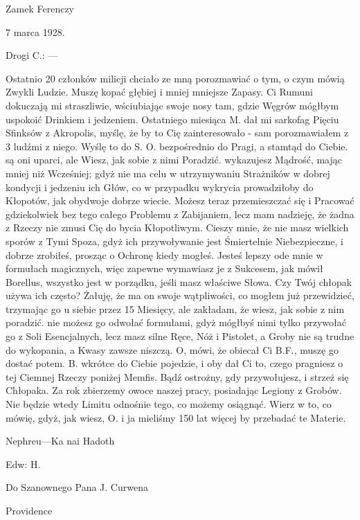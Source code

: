 \begin{displayquote}

\begin{flushright}
Zamek Ferenczy

7 marca 1928.
\end{flushright}

Drogi C.: —

Ostatnio 20 członków milicji chciało ze mną porozmawiać o tym, o czym mówią Zwykli Ludzie. Muszę kopać głębiej i mniej mniejsze Zapasy. Ci Rumuni dokuczają mi straszliwie, wściubiając swoje nosy tam, gdzie Węgrów mógłbym uspokoić Drinkiem i jedzeniem. Ostatniego miesiąca M. dał mi sarkofag Pięciu Sfinksów z Akropolis, myślę, że by to Cię zainteresowało - sam porozmawiałem z 3 ludźmi z niego. Wyślę to do S. O. bezpośrednio do Pragi, a stamtąd do Ciebie. są oni uparci, ale Wiesz, jak sobie z nimi Poradzić. wykazujesz Mądrość, mając mniej niż Wcześniej; gdyż nie ma celu w utrzymywaniu Strażników w dobrej kondycji i jedzeniu ich Głów, co w przypadku wykrycia prowadziłoby do Kłopotów, jak obydwoje dobrze wiecie. Możesz teraz przemieszczać się i Pracować gdziekolwiek bez tego całego Problemu z Zabijaniem, lecz mam nadzieję, że żadna z Rzeczy nie zmusi Cię do bycia Kłopotliwym. Cieszy mnie, że nie masz wielkich sporów z Tymi Spoza, gdyż ich przywoływanie jest Śmiertelnie Niebezpieczne, i dobrze zrobiłeś, prosząc o Ochronę kiedy mogłeś. Jesteś lepszy ode mnie w formułach magicznych, więc zapewne wymawiasz je z Sukcesem, jak mówił Borellus, wszystko jest w porządku, jeśli masz właściwe Słowa. Czy Twój chłopak używa ich często? Żałuję, że ma on swoje wątpliwości, co mogłem już przewidzieć, trzymając go u siebie przez 15 Miesięcy, ale zakładam, że wiesz, jak sobie z nim poradzić. nie możesz go odwołać formułami, gdyż mógłbyś nimi tylko przywołać go z Soli Esencjalnych, lecz masz silne Ręce, Nóż i Pistolet, a Groby nie są trudne do wykopania, a Kwasy zawsze niszczą. O, mówi, że obiecał Ci B.F., muszę go dostać potem. B. wkrótce do Ciebie pojedzie, i oby dał Ci to, czego pragniesz o tej Ciemnej Rzeczy poniżej Memfis. Bądź ostrożny, gdy przywołujesz, i strzeż się Chłopaka. Za rok zbierzemy owoce naszej pracy, posiadając Legiony z Grobów. Nie będzie wtedy Limitu odnośnie tego, co możemy osiągnąć. Wierz w to, co mówię, gdyż, jak wiesz, O. i ja mieliśmy 150 lat więcej by przebadać te Materie. 

\begin{flushright}
Nephreu—Ka nai Hadoth

Edw: H.
\end{flushright}

Do Szanownego Pana  J. Curwena

Providence

\end{displayquote}


